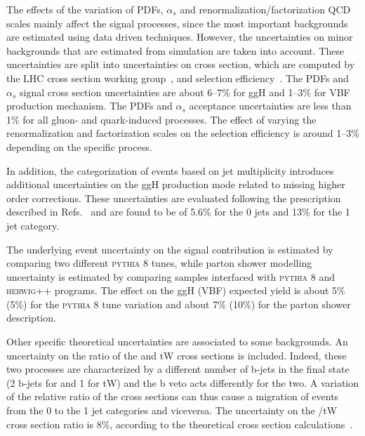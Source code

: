 The effects of the variation of PDFs, $\alpha_s$ and renormalization/factorization QCD scales mainly affect the signal processes, since the most important backgrounds are estimated using data driven techniques. However, the uncertainties on minor backgrounds that are estimated from simulation are taken into account. These uncertainties are split into uncertainties on cross section, which are computed by the LHC cross section working group~\cite{YRtmp}, and selection efficiency~\cite{Butterworth:2015oua}. The PDFs and $\alpha_{s}$ signal cross section  uncertainties are about 6--7\% for ggH and 1--3\% for VBF production mechanism. The PDFs and $\alpha_{s}$ acceptance uncertainties are less than 1\% for all gluon- and quark-induced processes. The effect of varying the renormalization and factorization scales on the selection efficiency is around 1--3\% depending on the specific process. 

In addition, the categorization of events based on jet multiplicity introduces additional uncertainties on the ggH production mode related to missing higher order corrections. These uncertainties are evaluated following the prescription described in Refs.~\cite{Stewart:2011cf,Heinemeyer:2013tqa} and are found to be of 5.6\% for the 0 jets and 13\% for the 1 jet category.

The underlying event uncertainty on the signal contribution is estimated by comparing two different \textsc{pythia 8} tunes, while parton shower modelling uncertainty is estimated by comparing samples interfaced with \textsc{pythia 8} and \textsc{herwig++} programs. 
The effect on the ggH (VBF) expected yield is about 5\% (5\%) for the \textsc{pythia 8} tune variation and about 7\% (10\%) for the parton shower description.

Other specific theoretical uncertainties are associated to some backgrounds. An uncertainty on the ratio of the \ttbar and tW cross sections is included. Indeed, these two processes are characterized by a different number of b-jets in the final state (2 b-jets for \ttbar and 1 for tW) and the b veto acts differently for the two. A variation of the relative ratio of the cross sections can thus cause a migration of events from the 0 to the 1 jet categories and viceversa. The uncertainty on the \ttbar/tW cross section ratio is 8\%, according to the theoretical cross section calculations~\cite{topxsec,singletop}.

